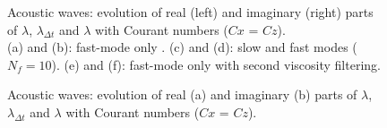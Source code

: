 \documentclass[a4paper]{article}
\numberwithin{equation}{section}
\begin{document}
\begin{figure}[!ht]
   \quad
   \caption{Acoustic waves: evolution of real (left) and imaginary (right) parts of $\lambda$, $\lambda_{\Delta t}$ and $\lambda$ with 
            Courant numbers ($Cx$ = $Cz$).\\
            (a) and (b): fast-mode only .
            (c) and (d): slow and fast modes ($N_f= 10$).
            (e) and (f): fast-mode only with second viscosity filtering.}
   \label{FigLambdaacous}
\end{figure}

\begin{figure}[!ht]
   \centering
   \quad
   \caption{Acoustic waves: evolution of real (a) and imaginary (b) parts of $\lambda$, $\lambda_{\Delta t}$ and $\lambda$ with 
            Courant numbers ($Cx$ = $Cz$).}
   \label{FigLambdaacous2}
\end{figure}
\end{document}
